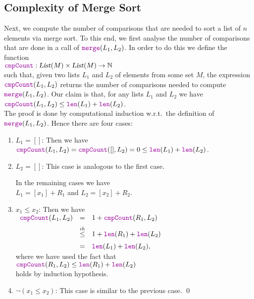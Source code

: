 \subsection{Complexity of Merge Sort}
Next, we compute the number of comparisons that are needed to sort a list of $n$
elements via merge sort.  To this end, we first analyse the number of comparisons that 
are done in a call of $\mytt{merge}(L_1, L_2)$.   In order to do this we define the function \\[0.2cm]
\hspace*{1.3cm} 
$\mytt{cmpCount}: \textsl{List}(M) \times \textsl{List}(M) \rightarrow \mathbb{N}$ 
\\[0.2cm]
such that, given two lists $L_1$ and $L_2$ of elements from some set $M$, the expression $\mytt{cmpCount}(L_1, L_2)$ returns the
number of comparisons needed to compute $\mytt{merge}(L_1,L_2)$. 
Our claim is that, for any lists $L_1$ and $L_2$ we have  
\\[0.2cm]
\hspace*{1.3cm}
$\mytt{cmpCount}(L_1, L_2) \leq \mytt{len}(L_1) + \mytt{len}(L_2)$. 
\\[0.2cm]
The proof is done by computational induction w.r.t.~the definition of $\mytt{merge}(L_1, L_2)$.  Hence there are four cases:
\begin{enumerate}
\item $L_1 = []$:  Then we have
      \\[0.2cm]
      \hspace*{1.3cm}
      $\mytt{cmpCount}(L_1, L_2) = \mytt{cmpCount}([], L_2) = 0 \leq  \mytt{len}(L_1) + \mytt{len}(L_2)$.
\item $L_2 = []$:  This case is analogous to the first case.

      In the remaining cases we have
      \\[0.2cm]
      \hspace*{1.3cm}
      $L_1 = [x_1] + R_1$ \quad and \quad   $L_2 = [x_2] + R_2$.
\item $x_1 \leq x_2$: Then we have
      \\[0.2cm]
      \hspace*{1.3cm}
      $\begin{array}{lcl}
       \mytt{cmpCount}(L_1, L_2) & = & 1 + \mytt{cmpCount}(R_1, L_2) \\[0.2cm]
                                  & \stackrel{ih}{\leq} & 1 + \mytt{len}(R_1) + \mytt{len}(L_2) \\[0.2cm]
                                 & = & \mytt{len}(L_1) + \mytt{len}(L_2),
       \end{array}
      $
      \\[0.2cm]
      where we have used the fact that
      \\[0.2cm]
      \hspace*{1.3cm}
      $\mytt{cmpCount}(R_1, L_2) \leq \mytt{len}(R_1) + \mytt{len}(L_2)$
      \\[0.2cm]
      holds by induction hypothesis.
    \item $\neg (x_1 \leq x_2)$: This case is similar to the previous case. \qed
\end{enumerate}

